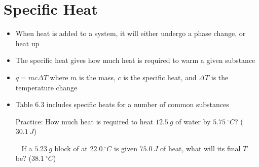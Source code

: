 \documentclass[12pt, openany, letterpaper]{memoir}
\begin{document}
\section{Specific Heat}
\begin{itemize}
	\item When heat is added to a system, it will either undergo a phase change, or heat up
	\item The specific heat gives how much heat is required to warm a given substance
	\item $q=mc\Delta T$ \hspace{2em} where $m$ is the mass, $c$ is the specific heat, and $\Delta T$ is the temperature change
	\item Table 6.3 includes specific heats for a number of common substances

	      Practice: How much heat is required to heat $12.5~g$ of water by $5.75~^\circ C$? ($30.1~J$)

	      ~\hphantom{Practice:} If a $5.23~g$ block of  at $22.0~^\circ C$ is given $75.0~J$ of heat, what will its final $T$ be? ($38.1~^\circ C$)
\end{itemize}
\end{document}

